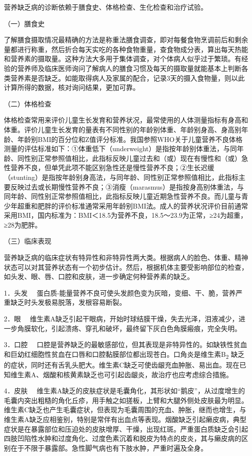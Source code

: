 营养缺乏病的诊断依赖于膳食史、体格检查、生化检查和治疗试验。

（一）膳食史

了解膳食摄取情况最精确的方法是称重法膳食调查，即对每餐食物烹调前后和剩余量都进行称重，然后折合每天实吃的各种食物重量，查食物成分表，算出每天热能和营养素的摄取量。这种方法大多用于集体调查，对个体病人似乎过于繁琐。有经验的营养师及临床医师询问了解病人的膳食习惯及每天的摄取量就能基本上判断各类营养素是否缺乏。如能取得病人及家属的配合，记录3天的摄入食物量，则以此计算所得的数据，核对询问结果，更加可靠。

（二）体格检查

体格检查常用来评价儿童生长发育和营养状况，最常使用的人体测量指标有身高和体重。评价儿童生长发育的量表有不同性别的年龄别体重、年龄别身高、身高别年龄、年龄别BMI的百分位和Z值评分标准。我国参照WHO关于儿童营养不良体格测量的评估标准如下：①体重低下（underweight）是指按年龄别体重法，与同年龄、同性别正常参照值相比，此指标反映儿童过去和（或）现在有慢性和（或）急性营养不良，但单凭此项不能区别急性还是慢性营养不良；②生长迟缓（stunting）是指按年龄别身高法，与同年龄、同性别正常参照值相比，此指标主要反映过去或长期慢性营养不良；③消瘦（marasmus）是指按身高别体重法，与同年龄、同性别正常参照值相比，此指标反映儿童近期急性营养不良。而儿童与青少年超重和肥胖的评价标准通常采用年龄别BMI法。成人的营养状况评价目前通常采用BMI，国内标准为：BMI＜18.5为营养不良，18.5～23.9为正常，≥24为超重，≥28为肥胖。

（三）临床表现

营养缺乏病的临床症状有特异性和非特异性两大类。根据病人的脸色、体重、精神状态可以对其营养状态有一个初步估计。然后，根据机体主要受影响部位的检查，如头发、眼、唇、口腔和皮肤，进一步确定何种营养素的缺乏。

{1．头发}
　蛋白质-能量营养不良可使头发颜色变为灰暗，变细、干、脆，营养严重缺乏时头发极易脱落，发根容易断裂。

{2．眼}
　维生素A缺乏引起干眼病，开始时球结膜干燥，失去光泽，泪液减少，进一步角膜软化，引起溃疡、穿孔和破坏，最终留下灰白色角膜瘢痕，完全失明。

{3．口腔}
　口腔是营养缺乏的最敏感部位，但其表现是非特异性的。如缺铁性贫血和巨幼红细胞性贫血在口唇和口腔黏膜部位都出现苍白。口角炎是维生素B\textsubscript{2}
缺乏的症状，同时还有舌乳头肥大。维生素C缺乏可使齿龈充血肿胀、易出血。现在已知维生素A、烟酸和核黄素缺乏也可引起齿龈炎，故治疗也应考虑综合措施。

{4．皮肤}
　维生素A缺乏的皮肤症状是毛囊角化，其形状如“鹅皮”，从过度增生的毛囊内突出粗糙的角化丘疹，用手触之如搓板，上臂和大腿外侧处皮肤最为明显。维生素C缺乏也产生毛囊症状，但表现为毛囊周围的充血、肿胀，继而也增生，与维生素A缺乏应相鉴别，特别是常伴有出血点等表现。烟酸缺乏引起癞皮病，典型症状是在暴露部位和压迫处的皮肤增厚、干燥，出现红斑。严重蛋白质缺乏会引起四肢凹陷性水肿和过度角化、过度色素沉着和脱皮为特点的皮炎，其与癞皮病的区别在于不限于暴露部。急性脚气病也有下肢水肿，严重时遍及全身。


